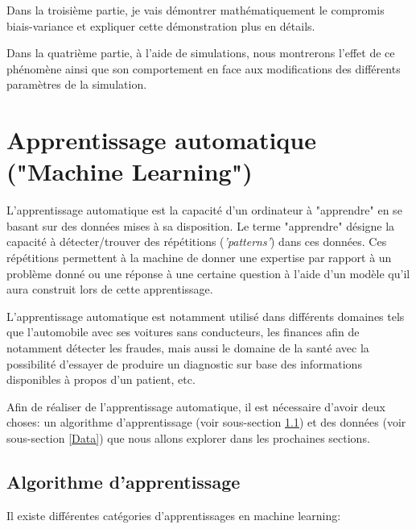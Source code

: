 \documentclass[a4paper]{article}
\begin{document}
Dans la troisième partie, je vais démontrer mathématiquement le compromis biais-variance et expliquer cette démonstration plus en détails. \newline

Dans la quatrième partie, à l'aide de simulations, nous montrerons l'effet de ce phénomène ainsi que son comportement en face aux modifications des différents paramètres de la simulation.\newline

\newpage

\section{Apprentissage automatique ("Machine Learning")}

L'apprentissage automatique est la capacité d'un ordinateur à "apprendre" en se basant sur des données mises à sa disposition. Le terme "apprendre" désigne la capacité à détecter/trouver des répétitions (\textit{'patterns'}) dans ces données. Ces répétitions permettent à la machine de donner une expertise par rapport à un problème donné ou une réponse à une certaine question à l'aide d'un modèle qu'il aura construit lors de cette apprentissage.\cite{MLPracticalApproach}\cite{UnderstandingML} \newline 

L'apprentissage automatique est notamment utilisé dans différents domaines tels que l'automobile avec ses voitures sans conducteurs, les finances afin de notamment détecter les fraudes, mais aussi le domaine de la santé avec la possibilité d'essayer de produire un diagnostic sur base des informations disponibles à propos d'un patient, etc. \newline

Afin de réaliser de l'apprentissage automatique, il est nécessaire d'avoir deux choses: un algorithme d'apprentissage (voir sous-section \ref{LearningAlgo}) et des données (voir sous-section \ref{Data}) que nous allons explorer dans les prochaines sections.

\newpage

\subsection{Algorithme d'apprentissage}
\label{LearningAlgo}
Il existe différentes catégories d'apprentissages en machine learning:
\end{document}
